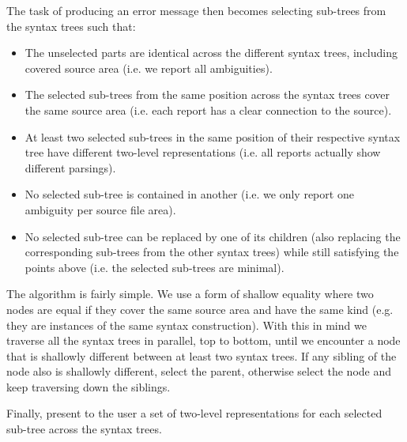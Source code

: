 \documentclass{kththesis}
\begin{document}
The task of producing an error message then becomes selecting sub-trees from the syntax trees such that:

\begin{itemize}
  \item The unselected parts are identical across the different syntax trees, including covered source area (i.e. we report all ambiguities).
  \item The selected sub-trees from the same position across the syntax trees cover the same source area (i.e. each report has a clear connection to the source).
  \item At least two selected sub-trees in the same position of their respective syntax tree have different two-level representations (i.e. all reports actually show different parsings).
  \item No selected sub-tree is contained in another (i.e. we only report one ambiguity per source file area).
  \item No selected sub-tree can be replaced by one of its children (also replacing the corresponding sub-trees from the other syntax trees) while still satisfying the points above (i.e. the selected sub-trees are minimal).
\end{itemize}

The algorithm is fairly simple. We use a form of shallow equality where two nodes are equal if they cover the same source area and have the same kind (e.g. they are instances of the same syntax construction). With this in mind we traverse all the syntax trees in parallel, top to bottom, until we encounter a node that is shallowly different between at least two syntax trees. If any sibling of the node also is shallowly different, select the parent, otherwise select the node and keep traversing down the siblings.

Finally, present to the user a set of two-level representations for each selected sub-tree across the syntax trees.


\end{document}
